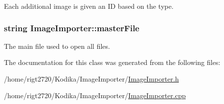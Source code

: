 Each additional image is given an I\-D based on the type. 

\hypertarget{classImageImporter_ac525acb521f6790cd85877f828fac54c}{
\subsubsection[{master\-File}]{\setlength{\rightskip}{0pt plus 5cm}string Image\-Importer\-::master\-File\hspace{0.3cm}{\ttfamily [private]}}}\label{classImageImporter_ac525acb521f6790cd85877f828fac54c}


The main file used to open all files. 



The documentation for this class was generated from the following files\-:\begin{DoxyCompactItemize}
\item 
/home/rigt2720/\-Kodika/\-Image\-Importer/\hyperlink{ImageImporter_8h}{Image\-Importer.\-h}\item 
/home/rigt2720/\-Kodika/\-Image\-Importer/\hyperlink{ImageImporter_8cpp}{Image\-Importer.\-cpp}\end{DoxyCompactItemize}
